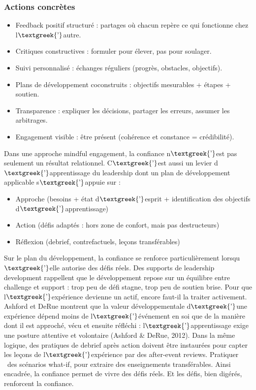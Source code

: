 \documentclass{article}
\begin{document}
\subsubsection{Actions concrètes}
\begin{itemize}
\item Feedback positif structuré : partages où chacun repère ce qui fonctionne chez l$\text{\textgreek{’}}$autre.
\item Critiques constructives : formuler pour élever, pas pour soulager.
\item Suivi personnalisé : échanges réguliers (progrès, obstacles, objectifs).
\item Plans de développement coconstruits : objectifs mesurables + étapes + soutien.
\item Transparence : expliquer les décisions, partager les erreurs, assumer les arbitrages.
\item Engagement visible : être présent (cohérence et constance = crédibilité).
\end{itemize}
Dans une approche mindful engagement, la confiance n$\text{\textgreek{’}}$est pas seulement un résultat relationnel.
C$\text{\textgreek{’}}$est aussi un levier d$\text{\textgreek{’}}$apprentissage du leadership dont un plan de
développement applicable s$\text{\textgreek{’}}$appuie sur :

\begin{itemize}
\item Approche (besoins + état d$\text{\textgreek{’}}$esprit + identification des objectifs
d$\text{\textgreek{’}}$apprentissage)
\item Action (défis adaptés : hors zone de confort, mais pas destructeurs)
\item Réflexion (debrief, contrefactuels, leçons transférables) 
\end{itemize}
Sur le plan du développement, la confiance se renforce particulièrement lorsqu$\text{\textgreek{’}}$elle autorise des
défis réels. Des supports de leadership development rappellent que le développement repose sur un équilibre entre
challenge et support : trop peu de défi stagne, trop peu de soutien brise. Pour que l$\text{\textgreek{’}}$expérience
devienne un actif, encore faut-il la traiter activement. Ashford et DeRue montrent que la valeur développementale
d$\text{\textgreek{’}}$une expérience dépend moins de l$\text{\textgreek{’}}$événement en soi que de la manière dont il
est approché, vécu et ensuite réfléchi : l$\text{\textgreek{’}}$apprentissage exige une posture attentive et volontaire
\label{ref:RND3PBoy8YU0X}(Ashford \& DeRue, 2012). Dans la même logique, des pratiques de debrief après action doivent
être instaurées pour capter les leçons de l$\text{\textgreek{’}}$expérience par des after-event reviews. Pratiquer
\ des scénarios what-if, pour extraire des enseignements transférables. Ainsi encadrée, la confiance permet de vivre
des défis réels. Et les défis, bien digérés, renforcent la confiance.
\end{document}
